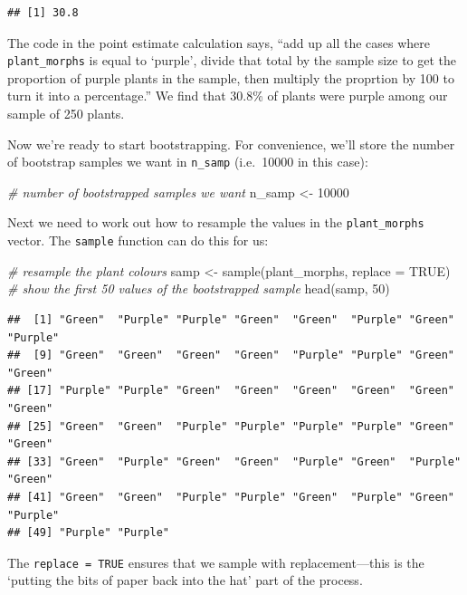 \documentclass[
]{book}
\newenvironment{Shaded}{\begin{snugshade}}{\end{snugshade}}
\newcommand{\AttributeTok}[1]{\textcolor[rgb]{0.77,0.63,0.00}{#1}}
\newcommand{\CommentTok}[1]{\textcolor[rgb]{0.56,0.35,0.01}{\textit{#1}}}
\newcommand{\ConstantTok}[1]{\textcolor[rgb]{0.00,0.00,0.00}{#1}}
\newcommand{\DecValTok}[1]{\textcolor[rgb]{0.00,0.00,0.81}{#1}}
\newcommand{\FunctionTok}[1]{\textcolor[rgb]{0.00,0.00,0.00}{#1}}
\newcommand{\NormalTok}[1]{#1}
\newcommand{\OtherTok}[1]{\textcolor[rgb]{0.56,0.35,0.01}{#1}}
\begin{document}
\begin{verbatim}
## [1] 30.8
\end{verbatim}

The code in the point estimate calculation says, ``add up all the cases where \texttt{plant\_morphs} is equal to `purple', divide that total by the sample size to get the proportion of purple plants in the sample, then multiply the proprtion by 100 to turn it into a percentage.'' We find that 30.8\% of plants were purple among our sample of 250 plants.

Now we're ready to start bootstrapping. For convenience, we'll store the number of bootstrap samples we want in \texttt{n\_samp} (i.e.~10000 in this case):

\begin{Shaded}
\begin{Highlighting}[]
\CommentTok{\# number of bootstrapped samples we want}
\NormalTok{n\_samp }\OtherTok{\textless{}{-}} \DecValTok{10000}
\end{Highlighting}
\end{Shaded}

Next we need to work out how to resample the values in the \texttt{plant\_morphs} vector. The \texttt{sample} function can do this for us:

\begin{Shaded}
\begin{Highlighting}[]
\CommentTok{\# resample the plant colours}
\NormalTok{samp }\OtherTok{\textless{}{-}} \FunctionTok{sample}\NormalTok{(plant\_morphs, }\AttributeTok{replace =} \ConstantTok{TRUE}\NormalTok{)}
\CommentTok{\# show the first 50 values of the bootstrapped sample}
\FunctionTok{head}\NormalTok{(samp, }\DecValTok{50}\NormalTok{) }
\end{Highlighting}
\end{Shaded}

\begin{verbatim}
##  [1] "Green"  "Purple" "Purple" "Green"  "Green"  "Purple" "Green"  "Purple"
##  [9] "Green"  "Green"  "Green"  "Green"  "Purple" "Purple" "Green"  "Green" 
## [17] "Purple" "Purple" "Green"  "Green"  "Green"  "Green"  "Green"  "Green" 
## [25] "Green"  "Green"  "Purple" "Purple" "Purple" "Purple" "Green"  "Green" 
## [33] "Green"  "Purple" "Green"  "Green"  "Purple" "Green"  "Purple" "Green" 
## [41] "Green"  "Green"  "Purple" "Purple" "Green"  "Purple" "Green"  "Purple"
## [49] "Purple" "Purple"
\end{verbatim}

The \texttt{replace\ =\ TRUE} ensures that we sample with replacement---this is the `putting the bits of paper back into the hat' part of the process.
\end{document}
